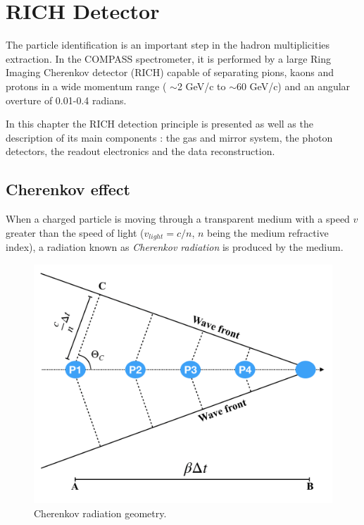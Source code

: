 
\chapter{RICH Detector}
\label{ch:RICH} %


The particle identification is an important step in the hadron multiplicities extraction.
In the COMPASS spectrometer, it is performed by a large Ring Imaging Cherenkov detector (RICH) capable of separating pions, kaons and protons in a wide momentum range ( $\sim$2 GeV/c to $\sim$60 GeV/c) and an angular overture of 0.01-0.4 radians.

In this chapter the RICH detection principle is presented as well as the description of its main components : the gas and mirror system, the photon detectors, the readout electronics and the data reconstruction.

\section{Cherenkov effect}

When a charged particle is moving through a transparent medium with a speed $v$ greater than the speed of light ($v_{light} = c/n$, $n$ being the medium refractive index), a radiation known as \textit{Cherenkov radiation} is produced by the medium.

\begin{figure}[!h]
  \centering
	\includegraphics[scale=0.5]{./gfx/CherenkovGeom.png}
	\caption{Cherenkov radiation geometry.}
	\label{pic:CherenkovGeom}
\end{figure}

